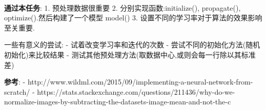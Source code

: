 \documentclass[11pt]{article}
\begin{document}
    \begin{center}
    \end{center}
    { \hspace*{\fill} \\}
    
     \textbf{通过本任务}: 1. 预处理数据很重要 2. 分别实现函数:initialize(),
propagate(), optimize().然后构建了一个模型 model() 3.
设置不同的学习率对于算法的效果影响至关重要.

    一些有意义的尝试: - 试着改变学习率和迭代的次数 -
尝试不同的初始化方法(随机初始化)来比较结果 -
测试其他预处理方法(取数据中心,或则会每一行除以其标准差)

    \textbf{参考}: -
http://www.wildml.com/2015/09/implementing-a-neural-network-from-scratch/
-
https://stats.stackexchange.com/questions/211436/why-do-we-normalize-images-by-subtracting-the-datasets-image-mean-and-not-the-c


    
    
    
    
\end{document}
